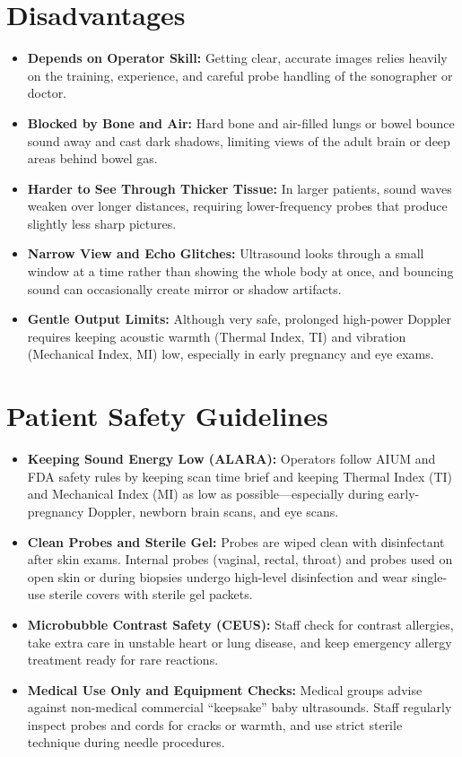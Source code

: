 \section{Disadvantages}
\begin{itemize}
  \item \textbf{Depends on Operator Skill:} Getting clear, accurate images relies heavily on the training, experience, and careful probe handling of the sonographer or doctor.
  \item \textbf{Blocked by Bone and Air:} Hard bone and air-filled lungs or bowel bounce sound away and cast dark shadows, limiting views of the adult brain or deep areas behind bowel gas.
  \item \textbf{Harder to See Through Thicker Tissue:} In larger patients, sound waves weaken over longer distances, requiring lower-frequency probes that produce slightly less sharp pictures.
  \item \textbf{Narrow View and Echo Glitches:} Ultrasound looks through a small window at a time rather than showing the whole body at once, and bouncing sound can occasionally create mirror or shadow artifacts.
  \item \textbf{Gentle Output Limits:} Although very safe, prolonged high-power Doppler requires keeping acoustic warmth (Thermal Index, TI) and vibration (Mechanical Index, MI) low, especially in early pregnancy and eye exams.
\end{itemize}

\section{Patient Safety Guidelines}
\begin{itemize}
  \item \textbf{Keeping Sound Energy Low (ALARA):} Operators follow AIUM and FDA safety rules by keeping scan time brief and keeping Thermal Index (TI) and Mechanical Index (MI) as low as possible---especially during early-pregnancy Doppler, newborn brain scans, and eye scans.
  \item \textbf{Clean Probes and Sterile Gel:} Probes are wiped clean with disinfectant after skin exams. Internal probes (vaginal, rectal, throat) and probes used on open skin or during biopsies undergo high-level disinfection and wear single-use sterile covers with sterile gel packets.
  \item \textbf{Microbubble Contrast Safety (CEUS):} Staff check for contrast allergies, take extra care in unstable heart or lung disease, and keep emergency allergy treatment ready for rare reactions.
  \item \textbf{Medical Use Only and Equipment Checks:} Medical groups advise against non-medical commercial ``keepsake'' baby ultrasounds. Staff regularly inspect probes and cords for cracks or warmth, and use strict sterile technique during needle procedures.
\end{itemize}

